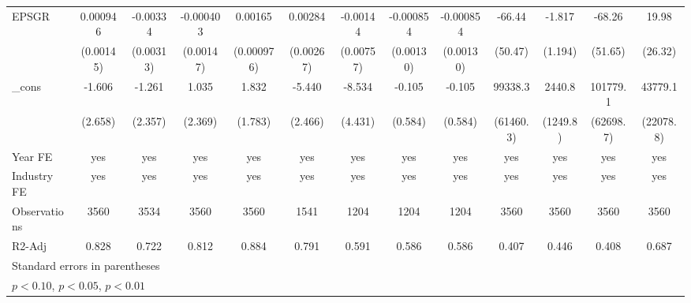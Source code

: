 \begin{table}[htbp]
\begin{tabular}{l*{12}{c}}
EPSGR               &    0.000946         &    -0.00334         &   -0.000403         &     0.00165         &     0.00284         &    -0.00144         &   -0.000854         &   -0.000854         &      -66.44         &      -1.817         &      -68.26         &       19.98         \\
                    &   (0.00145)         &   (0.00313)         &   (0.00147)         &  (0.000976)         &   (0.00267)         &   (0.00757)         &   (0.00130)         &   (0.00130)         &     (50.47)         &     (1.194)         &     (51.65)         &     (26.32)         \\
\_cons              &      -1.606         &      -1.261         &       1.035         &       1.832         &      -5.440\sym{**} &      -8.534\sym{*}  &      -0.105         &      -0.105         &     99338.3         &      2440.8\sym{*}  &    101779.1         &     43779.1\sym{*}  \\
                    &     (2.658)         &     (2.357)         &     (2.369)         &     (1.783)         &     (2.466)         &     (4.431)         &     (0.584)         &     (0.584)         &   (61460.3)         &    (1249.8)         &   (62698.7)         &   (22078.8)         \\
\hline
Year FE             &         yes         &         yes         &         yes         &         yes         &         yes         &         yes         &         yes         &         yes         &         yes         &         yes         &         yes         &         yes         \\
Industry FE         &         yes         &         yes         &         yes         &         yes         &         yes         &         yes         &         yes         &         yes         &         yes         &         yes         &         yes         &         yes         \\
Observations        &        3560         &        3534         &        3560         &        3560         &        1541         &        1204         &        1204         &        1204         &        3560         &        3560         &        3560         &        3560         \\
R2-Adj              &       0.828         &       0.722         &       0.812         &       0.884         &       0.791         &       0.591         &       0.586         &       0.586         &       0.407         &       0.446         &       0.408         &       0.687         \\
\hline\hline
\multicolumn{13}{l}{\footnotesize Standard errors in parentheses}\\
\multicolumn{13}{l}{\footnotesize \sym{*} \(p<0.10\), \sym{**} \(p<0.05\), \sym{***} \(p<0.01\)}\\
\end{tabular}
\end{table}
